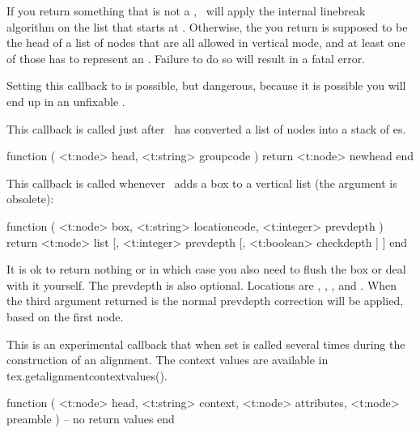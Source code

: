 If you return something that is not a , \LUATEX\ will apply the
internal linebreak algorithm on the list that starts at .
Otherwise, the  you return is supposed to be the head of a list of
nodes that are all allowed in vertical mode, and at least one of those has to
represent an \type {\hbox}. Failure to do so will result in a fatal error.

Setting this callback to  is possible, but dangerous, because it is
possible you will end up in an unfixable .

\stopsubsection

\startsubsection[title=post_linebreak]

This callback is called just after \LUATEX\ has converted a list of nodes into a
stack of \type {\hbox}es.

\starttyping[option=LUA]
function (
    <t:node>   head,
    <t:string> groupcode
)
    return <t:node> newhead
end
\stoptyping

\stopsubsection

\startsubsection[title=append_to_vlist]

This callback is called whenever \LUATEX\ adds a box to a vertical list (the
 argument is obsolete):

\starttyping[option=LUA]
function (
    <t:node>    box,
    <t:string>  locationcode,
    <t:integer> prevdepth
)
    return <t:node> list [, <t:integer> prevdepth [, <t:boolean> checkdepth ] ]
end
\stoptyping

It is ok to return nothing or  in which case you also need to flush
the box or deal with it yourself. The prevdepth is also optional. Locations are
, , ,  and
. When the third argument returned is  the
normal prevdepth correction will be applied, based on the first node.

\stopsubsection

\startsubsection[title=alignment]

This is an experimental callback that when set is called several times during the
construction of an alignment. The context values are available in \typ
{tex.getalignmentcontextvalues()}.

\starttyping[option=LUA]
function (
    <t:node>   head,
    <t:string> context,
    <t:node>   attributes,
    <t:node>   preamble
)
    -- no return values
end
\stoptyping

